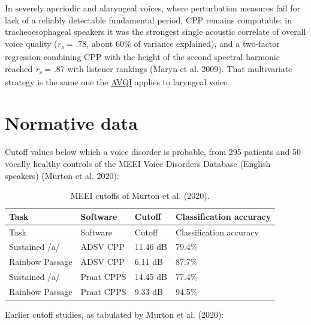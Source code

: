 \documentclass[
  english,
  letterpaper,
]{scrbook}
\begin{document}
In severely aperiodic and alaryngeal voices, where perturbation measures
fail for lack of a reliably detectable fundamental period, CPP remains
computable: in tracheoesophageal speakers it was the strongest single
acoustic correlate of overall voice quality (\emph{r\textsubscript{s}} =
.78, about 60\% of variance explained), and a two-factor regression
combining CPP with the height of the second spectral harmonic reached
\emph{r\textsubscript{s}} = .87 with listener rankings (Maryn et al.
2009). That multivariate strategy is the same one the
\href{avqi.qmd}{AVQI} applies to laryngeal voice.

\section{Normative data}\label{normative-data}

Cutoff values below which a voice disorder is probable, from 295
patients and 50 vocally healthy controls of the MEEI Voice Disorders
Database (English speakers) (Murton et al. 2020):

\begin{longtable}[]{@{}llll@{}}
\caption{MEEI cutoffs of Murton et al.
(2020).}\label{tbl-cpp-cutoffs}\tabularnewline
\toprule\noalign{}
Task & Software & Cutoff & Classification accuracy \\
\midrule\noalign{}
\endfirsthead
\toprule\noalign{}
Task & Software & Cutoff & Classification accuracy \\
\midrule\noalign{}
\endhead
\bottomrule\noalign{}
\endlastfoot
Sustained /a/ & ADSV CPP & 11.46 dB & 79.4\% \\
Rainbow Passage & ADSV CPP & 6.11 dB & 87.7\% \\
Sustained /a/ & Praat CPPS & 14.45 dB & 77.4\% \\
Rainbow Passage & Praat CPPS & 9.33 dB & 94.5\% \\
\end{longtable}

Earlier cutoff studies, as tabulated by Murton et al. (2020):
\end{document}
